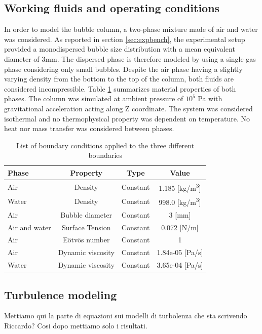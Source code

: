 \documentclass[11pt,a4paper]{article}
\begin{document}
\subsection{Working fluids and operating conditions}
\label{sub:fluids}
In order to model the bubble column, a two-phase mixture made of air and water was considered. As reported in section \ref{sec:expbench}, the experimental setup provided a monodispersed bubble size distribution with a mean equivalent diameter of 3mm. The dispersed phase is therefore modeled by using a single gas phase considering only small bubbles. Despite the air phase having a slightly varying density from the bottom to the top of the column, both fluids are considered incompressible. Table \ref{tab:materials} summarizes material properties of both phases. The column was simulated at ambient pressure of $10^5$ Pa with gravitational acceleration acting along Z coordinate. The system was considered isothermal and no thermophysical property was dependent on temperature. No heat nor mass transfer was considered between phases.

\begin{table}[H]
  \centering
    \begin{tabular}{|p{7em} c c c|}
    \hline
    \rowcolor{bluePoli!40}
    \textbf{Phase} & \textbf{Property} & \textbf{Type} & \textbf{Value} \T\B \\
     \hline \hline
    Air & Density & Constant & 1.185 [kg/m\textsuperscript{3}] \T\B \\
    Water & Density & Constant & 998.0 [kg/m\textsuperscript{3}] \T\B \\
    Air & Bubble diameter & Constant & 3 [mm] \T\B \\  
    Air and water & Surface Tension & Constant & 0.072 [N/m] \T\B \\   
    Air & E{ö}tv{ö}s number & Constant & 1    \T\B \\ 
    Air & Dynamic viscosity & Constant & 1.84e-05 [Pa/s]    \T\B \\ 
    Water & Dynamic viscosity & Constant & 3.65e-04 [Pa/s]    \T\B \\ 
    \hline
    \end{tabular}%
  \caption{List of boundary conditions applied to the three different boundaries}
  \label{tab:materials}%
\end{table}%



\subsection{Turbulence modeling}
\label{sub:turbmodels}
{\color{red}Mettiamo qui la parte di equazioni sui modelli di turbolenza che sta scrivendo Riccardo? Cosi dopo mettiamo solo i risultati.}
\end{document}
